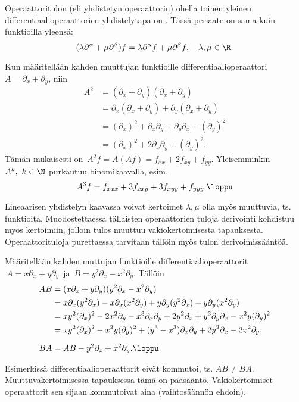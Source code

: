 Operaattoritulon (eli yhdistetyn operaattorin) ohella toinen yleinen
differentiaalioperaattorien yhdistelytapa on
%
. Tässä periaate on sama kuin funktioilla yleensä:
\[
(\lambda\partial^\alpha+\mu\partial^\beta)f=\lambda\partial^\alpha f+\mu\partial^\beta f,\quad 
\lambda,\mu\in\R.
\]
\begin{Exa}
Kun määritellään kahden muuttujan funktioille differentiaalioperaattori
$A=\partial_x+\partial_y$, niin
\begin{align*}
A^2 &= (\partial_x+\partial_y)(\partial_x+\partial_y) \\
    &= \partial_x(\partial_x+\partial_y)+\partial_y(\partial_x+\partial_y) \\
    &= (\partial_x)^2+\partial_x\partial_y+\partial_y\partial_x + (\partial_y)^2 \\
    &= (\partial_x)^2+2\partial_x\partial_y + (\partial_y)^2.
\end{align*}
Tämän mukaisesti on $\,A^2 f= A(Af)=f_{xx}+2f_{xy}+f_{yy}$. Yleisemminkin $A^k,\ k\in\N$
purkautuu binomikaavalla, esim.\
\[
A^3 f=f_{xxx}+3f_{xxy}+3f_{xyy}+f_{yyy}. \loppu
\]
\end{Exa}
Lineaarisen yhdistelyn kaavassa voivat kertoimet $\lambda,\mu$ olla myös muuttuvia, ts.\
%
funktioita. Muodostettaessa tällaisten \kor{muuttuvakertoimisten} operaattorien tuloja
derivointi kohdistuu myös kertoimiin, jolloin tulos muuttuu vakiokertoimisesta tapauksesta.
Operaattorituloja purettaessa tarvitaan tällöin myös tulon derivoimissääntöä.
\begin{Exa} Määritellään kahden muttujan funktioille differentiaalioperaattorit
$\ A=x\partial_x+y\partial_y\,$ ja $\,B=y^2\partial_x-x^2\partial_y$. Tällöin
\begin{align*}
AB &= (x\partial_x+y\partial_y)(y^2\partial_x-x^2\partial_y) \\
   &= x\partial_x(y^2\partial_x)-x\partial_x(x^2\partial_y)
                                +y\partial_y(y^2\partial_x)-y\partial_y(x^2\partial_y) \\
   &= xy^2(\partial_x)^2-2x^2\partial_y-x^3\partial_x\partial_y+2y^2\partial_x
                        +y^3\partial_y\partial_x-x^2y(\partial_y)^2 \\
   &= xy^2(\partial_x)^2-x^2y(\partial_y)^2+(y^3-x^3)\partial_x\partial_y
                        +2y^2\partial_x-2x^2\partial_y, \\[2mm]
BA &= AB-y^2\partial_x+x^2\partial_y. \loppu
\end{align*}
\end{Exa}
Esimerkissä differentiaalioperaattorit eivät kommutoi, ts. $AB \neq BA$. Muuttuvakertoimisessa
tapauksessa tämä on pääsääntö. Vakiokertoimiset operaattorit sen sijaan kommutoivat aina 
(vaihtosäännön ehdoin).

